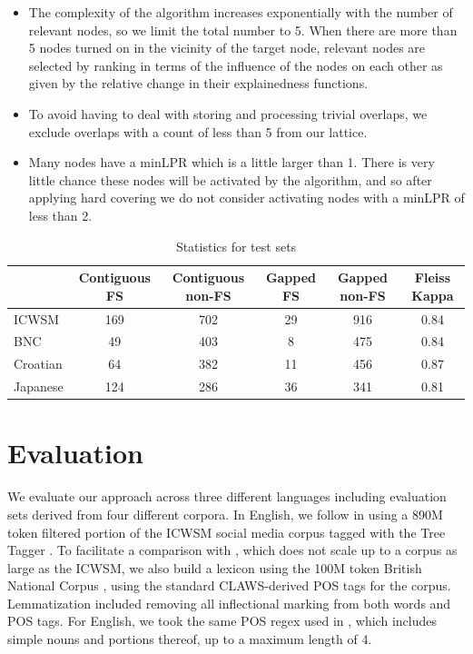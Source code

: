 \documentclass[11pt,letterpaper]{article}
\begin{document}
\begin{itemize}
\item The complexity of the algorithm increases exponentially with the number of relevant nodes, so we limit the total number to 5. When there are more than 5 nodes turned on in the vicinity of the target node, relevant nodes are selected by ranking in terms of the influence of the nodes on each other as given by the relative change in their explainedness functions.
\item To avoid having to deal with storing and processing trivial overlaps, we exclude overlaps with a count of less than 5 from our lattice.
\item Many nodes have a minLPR which is a little larger than 1. There is very little chance these nodes will be activated by the algorithm, and so after applying hard covering we do not consider activating nodes with a minLPR of less than 2.
\end{itemize}

\begin{table}[!bt]
 
 \begin{center}
  \caption{ Statistics for test sets}
	 \label{tab:stats}
	 \begin{tabular}{lccccc}

       \hline
			& Contiguous FS & Contiguous non-FS & Gapped FS & Gapped non-FS & Fleiss Kappa\\
			 \hline
			ICWSM & 169 & 702 & 29 & 916& 0.84 \\
			BNC & 49 & 403 & 8 & 475 & 0.84 \\
			Croatian & 64 & 382 & 11 & 456 & 0.87 \\
			Japanese & 124 & 286 & 36 & 341 & 0.81\\
       \hline
 \end{tabular}

 \end{center}

 \end{table}	

\section{Evaluation} \label{sec:evaluation}

We evaluate our approach across three different languages including evaluation sets derived from four different corpora. In English, we follow  in using a 890M token filtered portion of the ICWSM social media corpus \cite{ICWSM} tagged with the Tree Tagger \cite{Schmid95}. To facilitate a comparison with , which does not scale up to a corpus as large as the ICWSM, we also build a lexicon using the 100M token British National Corpus \cite{BNC}, using the standard CLAWS-derived POS tags for the corpus. Lemmatization included removing all inflectional marking from both words and POS tags. For English, we took the same POS regex used in , which includes simple nouns and portions thereof, up to a maximum length of 4.
\end{document}
